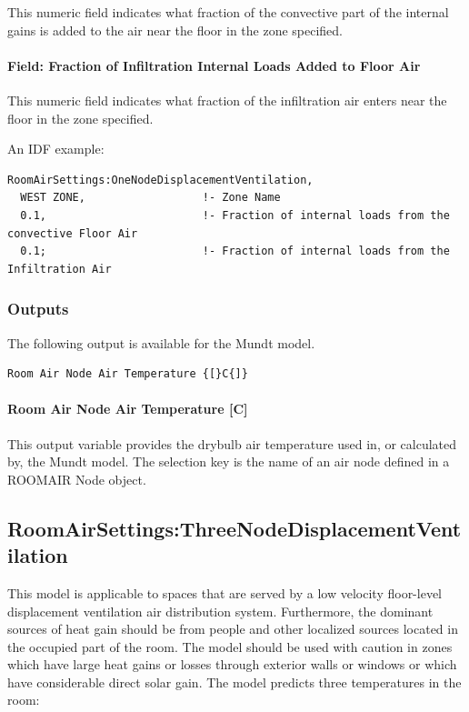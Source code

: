This numeric field indicates what fraction of the convective part of the internal gains is added to the air near the floor in the zone specified.

\paragraph{Field: Fraction of Infiltration Internal Loads Added to Floor Air}\label{field-fraction-of-infiltration-internal-loads-added-to-floor-air}

This numeric field indicates what fraction of the infiltration air enters near the floor in the zone specified.

An IDF example:

\begin{lstlisting}
RoomAirSettings:OneNodeDisplacementVentilation,
  WEST ZONE,                  !- Zone Name
  0.1,                        !- Fraction of internal loads from the convective Floor Air
  0.1;                        !- Fraction of internal loads from the Infiltration Air
\end{lstlisting}

\subsubsection{Outputs}\label{roomairsettingsonenodedisplacementventilation-outputs}

The following output is available for the Mundt model.

\begin{lstlisting}
Room Air Node Air Temperature {[}C{]}
\end{lstlisting}

\paragraph{Room Air Node Air Temperature {[}C{]}}\label{room-air-node-air-temperature-c}

This output variable provides the drybulb air temperature used in, or calculated by, the Mundt model. The selection key is the name of an air node defined in a ROOMAIR Node object.

\subsection{RoomAirSettings:ThreeNodeDisplacementVentilation}\label{roomairsettingsthreenodedisplacementventilation}

This model is applicable to spaces that are served by a low velocity floor-level displacement ventilation air distribution system. Furthermore, the dominant sources of heat gain should be from people and other localized sources located in the occupied part of the room. The model should be used with caution in zones which have large heat gains or losses through exterior walls or windows or which have considerable direct solar gain. The model predicts three temperatures in the room:

